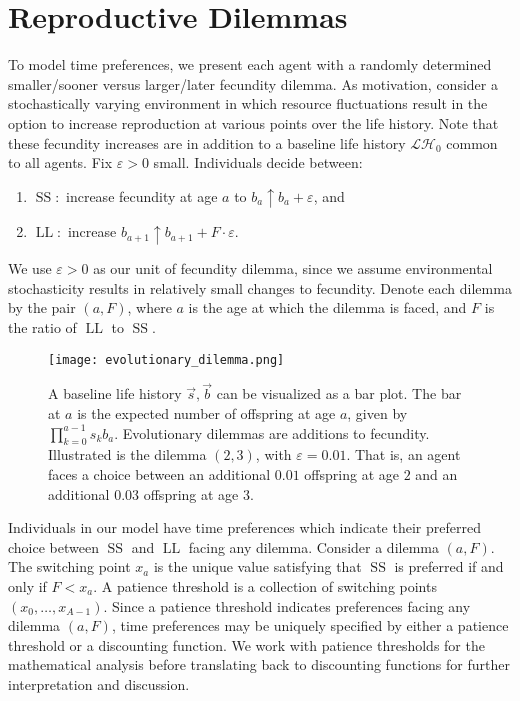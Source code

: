 \documentclass[titlepage, hidelinks, 12pt]{article}
\theoremstyle{plain}
\theoremstyle{remark}
\theoremstyle{definition}
\newcommand{\LH}{\mathcal{LH}}
\DeclareMathOperator{\smallersooner}{SS}
\DeclareMathOperator{\largerlater}{LL}
\begin{document}
\section{Reproductive Dilemmas}
To model time preferences, we present each agent with a randomly determined
smaller/sooner versus larger/later fecundity dilemma.  As motivation, consider
a stochastically varying environment in which resource fluctuations result in the option to
increase reproduction at various points over the life history. Note that these fecundity increases are in addition to a baseline life history
$\LH_0$ common to all agents.  
Fix $\varepsilon > 0$ small.  
Individuals decide between:
\begin{enumerate}
    \item $\smallersooner:$ increase fecundity at age $a$ to $b_a\uparrow b_{a} + \varepsilon$, and
    \item $\largerlater:$ increase $b_{a+1}\uparrow b_{a+1} + F\cdot \varepsilon$.
\end{enumerate}
We use $\varepsilon > 0$ as our unit of fecundity dilemma, since we assume environmental stochasticity results in relatively small changes to 
fecundity. 
Denote each dilemma by the pair $(a, F)$, where $a$ is the age at which the dilemma is faced,
and $F$ is the ratio of $\largerlater$ to $\smallersooner$. 

\begin{figure}[H]
    \centering
    \texttt{[image: evolutionary\_dilemma.png]}
    \caption[Baseline life history and reproductive dilemma example.]{A baseline life history $\vec{s}, \vec{b}$ can be visualized as a bar plot. The bar at $a$ is the expected number of offspring at
        age $a$, given by
    $\prod_{k = 0}^{a-1} s_k b_a$. Evolutionary dilemmas are additions to fecundity. Illustrated is the dilemma $(2, 3)$, with
$\varepsilon = 0.01$. That is, an agent faces a choice between an additional $0.01$ offspring at age $2$ and an additional $0.03$ offspring
at age $3$.} 
\end{figure}

Individuals in our model have time preferences which indicate their preferred choice between $\smallersooner$ and $\largerlater$ facing any
dilemma. 
Consider a dilemma $(a, F)$. The switching point $x_a$ is the unique value satisfying that $\smallersooner$ is preferred
if and only if $F < x_a$. 
A patience threshold is a collection of switching points $(x_0, \ldots, x_{A-1})$.
Since a patience threshold indicates preferences facing any dilemma $(a, F)$, time preferences may be uniquely 
specified by either a patience threshold or a discounting function. We work with patience thresholds
for the mathematical analysis before translating back to discounting functions for further interpretation and discussion. 
\end{document}
